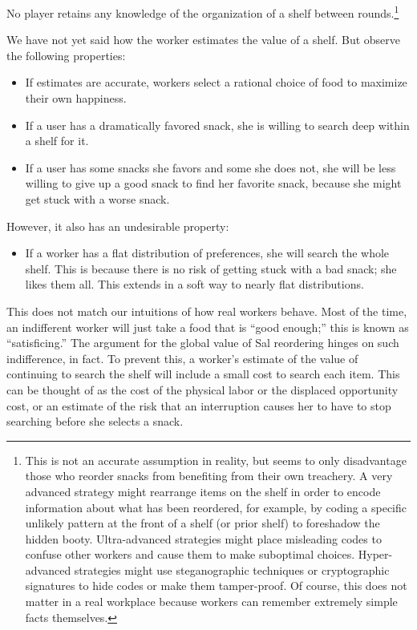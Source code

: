 \documentclass[twocolumn]{article}
\begin{document}
No player retains any knowledge of the organization of a shelf between rounds.\footnote{This is not an accurate assumption in reality, but seems to only disadvantage those who reorder snacks from benefiting from their own treachery. A very advanced strategy might rearrange items on the shelf in order to encode information about what has been reordered, for example, by coding a specific unlikely pattern at the front of a shelf (or prior shelf) to foreshadow the hidden booty. Ultra-advanced strategies might place misleading codes to confuse other workers and cause them to make suboptimal choices. Hyper-advanced strategies might use steganographic techniques or cryptographic signatures to hide codes or make them tamper-proof. Of course, this does not matter in a real workplace because workers can remember extremely simple facts themselves.}

We have not yet said how the worker estimates the value of a shelf. But observe the following properties:

\begin{itemize}
\item If estimates are accurate, workers select a rational choice of food to maximize their own happiness.
\item If a user has a dramatically favored snack, she is willing to search deep within a shelf for it.
\item If a user has some snacks she favors and some she does not, she will be less willing to give up a good snack to find her favorite snack, because she might get stuck with a worse snack.
\end{itemize}

However, it also has an undesirable property:

\begin{itemize}
\item If a worker has a flat distribution of preferences, she will search the whole shelf. This is because there is no risk of getting stuck with a bad snack; she likes them all. This extends in a soft way to nearly flat distributions.
\end{itemize}

This does not match our intuitions of how real workers behave. Most of the time, an indifferent worker will just take a food that is ``good enough;'' this is known as ``satisficing.''\cite{simon1956rational} The argument for the global value of Sal reordering hinges on such indifference, in fact. To prevent this, a worker's estimate of the value of continuing to search the shelf will include a small cost to search each item. This can be thought of as the cost of the physical labor or the displaced opportunity cost, or an estimate of the risk that an interruption causes her to have to stop searching before she selects a snack.
\end{document}
